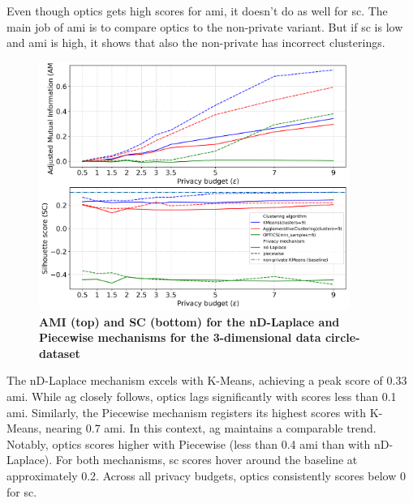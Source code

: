 Even though \gls{optics} gets high scores for \gls{ami}, it doesn't do as well for \gls{sc}. The main job of \gls{ami} is to compare \gls{optics} to the non-private variant. But if \gls{sc} is low and \gls{ami} is high, it shows that also the non-private has incorrect clusterings.
\newpage
\begin{figure}[H]
  \centering

  \caption{\textbf{AMI (top) and SC (bottom) for the nD-Laplace and Piecewise mechanisms for the 3-dimensional data circle-dataset}}
  \includegraphics[width=0.9\textwidth]{Results/nd-laplace/nd-Laplace/circle-dataset/ami-and-sc_3_dimensions.png}

  \label{fig:validation-circle-dataset_comparison_3d-laplace}
\end{figure}
The nD-Laplace mechanism excels with K-Means, achieving a peak score of 0.33 \gls{ami}. While \gls{ag} closely follows, \gls{optics} lags significantly with scores less than 0.1 \gls{ami}. Similarly, the Piecewise mechanism registers its highest scores with K-Means, nearing 0.7 \gls{ami}. In this context, \gls{ag} maintains a comparable trend. Notably, \gls{optics} scores higher with Piecewise (less than 0.4 \gls{ami} than with nD-Laplace). For both mechanisms, \gls{sc} scores hover around the baseline at approximately 0.2. Across all privacy budgets, \gls{optics} consistently scores below 0 for \gls{sc}.
\newpage
